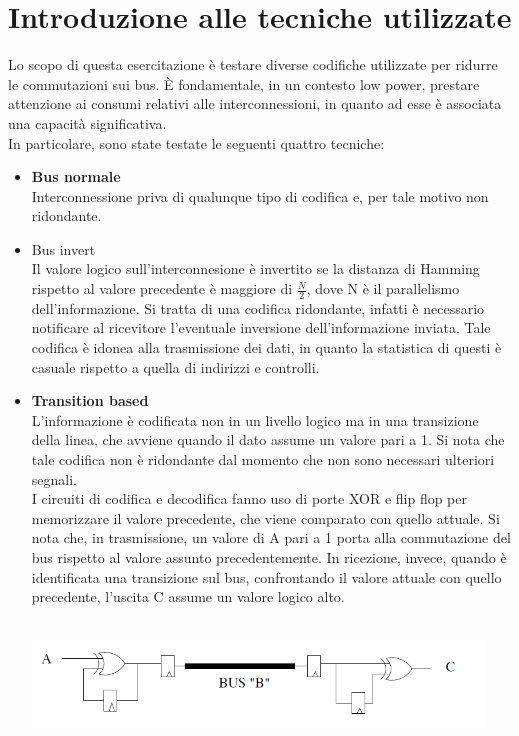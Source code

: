 \documentclass[11pt,  english, makeidx, a4paper, titlepage, oneside]{book}
\begin{document}
\section{Introduzione alle tecniche utilizzate}
Lo scopo di questa esercitazione è testare diverse codifiche utilizzate per ridurre le commutazioni sui bus. È fondamentale, in un contesto low power, prestare attenzione ai consumi relativi alle interconnessioni, in quanto ad esse è associata una capacità significativa.
\\
In particolare, sono state testate le seguenti quattro tecniche:
\begin{itemize}
\item \textbf{Bus normale}
\\
Interconnessione priva di qualunque tipo di codifica e, per tale motivo non ridondante.
\item Bus invert
\\
Il valore logico sull'interconnesione è invertito se la distanza di Hamming rispetto al valore precedente è maggiore di $\frac{N}{2}$, dove N è il parallelismo dell'informazione. Si tratta di una codifica ridondante, infatti è necessario notificare al ricevitore l'eventuale inversione dell'informazione inviata.
Tale codifica è idonea alla trasmissione dei dati, in quanto la statistica di questi è casuale rispetto a quella di indirizzi e controlli.
\item \textbf{Transition based}
\\
L'informazione è codificata non in un livello logico ma in una transizione della linea, che avviene quando il dato assume un valore pari a 1. Si nota che tale codifica non è ridondante dal momento che non sono necessari ulteriori segnali.
\\
I circuiti di codifica e decodifica fanno uso di porte XOR e flip flop per memorizzare il valore precedente, che viene comparato con quello attuale. Si nota che, in trasmissione, un valore di A pari a 1 porta alla commutazione del bus rispetto al valore assunto precedentemente. In ricezione, invece, quando è identificata una transizione sul bus, confrontando il valore attuale con quello precedente, l'uscita C assume un valore logico alto.
\\\\
\centerline{\includegraphics[width=12cm]{./img/Lab_4/tran_based.png}}

\end{itemize}
\end{document}

